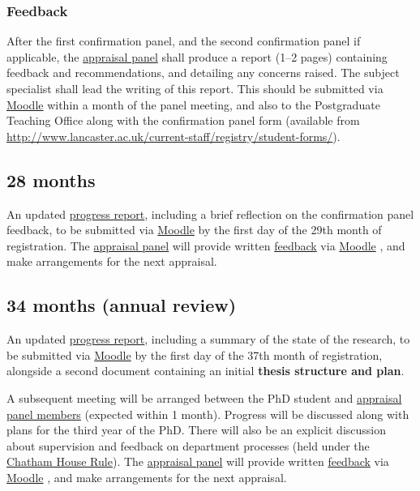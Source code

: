\documentclass[12pt,a4paper]{article}
\begin{document}
\subsubsection{Feedback}
After the first confirmation panel, and the second confirmation panel if applicable, the \hyperref[sec:panel]{appraisal panel} shall produce a report (1--2 pages) containing feedback and recommendations, and detailing any concerns raised. The subject specialist shall lead the writing of this report. This should be submitted via \href{https://modules.lancaster.ac.uk/course/view.php?id=7050}{Moodle} within a month of the panel meeting, and also to the Postgraduate Teaching Office along with the confirmation panel form (available from \url{http://www.lancaster.ac.uk/current-staff/registry/student-forms/}).


\subsection{28 months} \label{sec:28months}
An updated \hyperref[sec:report]{progress report}, including a brief reflection on the confirmation panel feedback, to be submitted via \href{https://modules.lancaster.ac.uk/course/view.php?id=7050}{Moodle}  by the first day of the 29th month of registration. The \hyperref[sec:panel]{appraisal panel} will provide written \hyperref[sec:feedback]{feedback} via \href{https://modules.lancaster.ac.uk/course/view.php?id=7050}{Moodle} , and make arrangements for the next appraisal.


\subsection{34 months (annual review)} \label{sec:34months}
An updated \hyperref[sec:report]{progress report}, including a summary of the state of the research, to be submitted via \href{https://modules.lancaster.ac.uk/course/view.php?id=7050}{Moodle}  by the first day of the 37th month of registration, alongside a second document containing an initial \textbf{thesis structure and plan}.

A subsequent meeting will be arranged between the PhD student and \hyperref[sec:panel]{appraisal panel members} (expected within 1 month). Progress will be discussed along with plans for the third year of the PhD. There will also be an explicit discussion about supervision and feedback on department processes (held under the \href{https://www.chathamhouse.org/chatham-house-rule}{Chatham House Rule}). The \hyperref[sec:panel]{appraisal panel} will provide written \hyperref[sec:feedback]{feedback} via \href{https://modules.lancaster.ac.uk/course/view.php?id=7050}{Moodle} , and make arrangements for the next appraisal.
\end{document}
